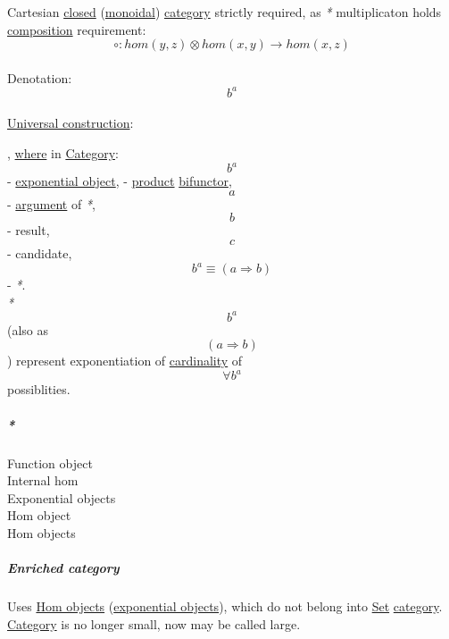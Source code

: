 \documentclass[11pt]{article}
\begin{document}
Cartesian \hyperref[orgfa67abb]{closed} (\hyperref[org71af906]{monoidal}) \hyperref[org3e3a79b]{category} strictly required, as \emph{*} multiplicaton holds \hyperref[org24a8abd]{composition} requirement:\\

$$ \circ:hom(y,z) \otimes hom(x,y) \to hom(x,z) $$\\

Denotation:\\
$$ b^{a} $$\\

\hyperref[orga62387d]{Universal construction}:\\

, \hyperref[orgefd1ecd]{where} in \hyperref[org3e3a79b]{Category}: $$ b^{a} $$ - \hyperref[orgd85401a]{exponential object}, \texttimes{} - \hyperref[orga3d1454]{product} \hyperref[org459acb0]{bifunctor}, $$ a $$ - \hyperref[orgf66a5f7]{argument} of \emph{*}, $$ b $$ - result, $$ c $$ - candidate, $$ b^{a} \equiv ( a \Rightarrow b ) $$ - \emph{*}.\\

\emph{*} $$ b^{a} $$ (also as $$ (a \Rightarrow b) $$) represent exponentiation of \hyperref[orgd81825c]{cardinality} of $$ \forall b^{a} $$ possiblities.\\

\subparagraph{\emph{*}}
\label{sec:org278367e}
\label{org70506b9}Function object\\
\label{org4df168b}Internal hom\\
\label{org124c385}Exponential objects\\
\label{org605b75c}Hom object\\
\label{orgf5433c2}Hom objects\\

\subparagraph{\label{org0f79087}Enriched category}
\label{sec:org8547db0}
Uses \hyperref[orgf5433c2]{Hom objects} (\hyperref[org124c385]{exponential objects}), which do not belong into \hyperref[orgbed80ba]{Set} \hyperref[org3e3a79b]{category}.\\
\hyperref[org3e3a79b]{Category} is no longer small, now may be called large.\\
\end{document}
